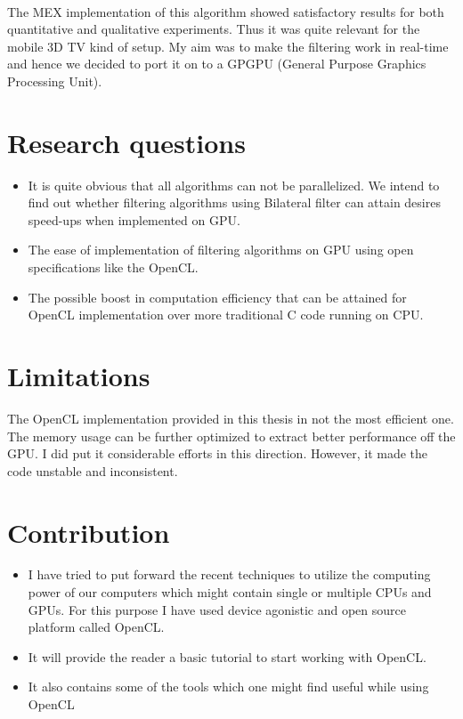 \paragraph {}
The MEX implementation of this algorithm showed satisfactory results for both quantitative and qualitative experiments. Thus it was quite relevant for the mobile 3D TV kind of setup. My aim was to make the filtering work in real-time and hence we decided to port it on to a GPGPU (General Purpose Graphics Processing Unit).
  
\section{Research questions}
\begin{itemize}
	\item It is quite obvious that all algorithms can not be parallelized. We intend to find out whether filtering algorithms using Bilateral filter can attain desires speed-ups when implemented on GPU.
	\item The ease of implementation of filtering algorithms on GPU using open specifications like the OpenCL.
	\item The possible boost in computation efficiency that can be attained for OpenCL implementation over more traditional C code running on CPU. 
\end{itemize}

\section{Limitations}
The OpenCL implementation provided in this thesis in not the most efficient one. The memory usage can be further optimized to extract better performance off the GPU. I did put it considerable efforts in this direction. However, it made the code unstable and inconsistent. 

\section{Contribution}
\begin{itemize}
	\item I have tried to put forward the recent techniques to utilize the computing power of our computers which might contain single or multiple CPUs and GPUs. For this purpose I have used device agonistic and open source platform called OpenCL.
	\item It will provide the reader a basic tutorial to start working with OpenCL. 
	\item It also contains some of the tools which one might find useful while using OpenCL
\end{itemize}

